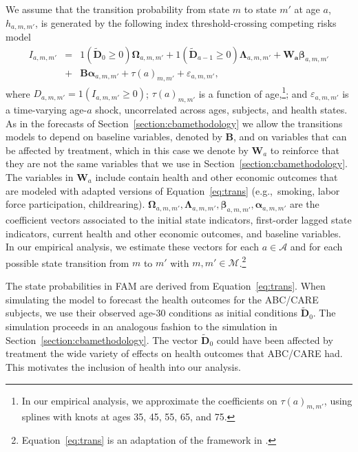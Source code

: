 We assume that the transition probability from state $m$ to state $m'$ at age $a$, $h_{a,m,m'}$, is generated by the following index threshold-crossing competing risks model
\begin{eqnarray}
I_{a,m,m'} &=& \bm{\mathit{1}} \left( \tilde{\bm{D}}_{0} \geq 0 \right) \bm{\Omega}_{a,m,m'} + \bm{\mathit{1}} \left( \tilde{\bm{D}}_{a-1} \geq 0\right) \bm{\Lambda}_{a,m,m'}  + \bm{W_a} \bm{\beta}_{a,m,m'}  \nonumber \\ 
&+&  \bm{B} \bm{\alpha}_{a,m,m'} + \tau \left( a \right)_{m,m'} + \varepsilon_{a,m,m'}, \label{eq:trans}
\end{eqnarray}
where $D_{a,m,m'} = \bm{\mathit{1}}  \left( I_{a,m,m'} \geq 0 \right)$; $\tau \left( a \right)_{m,m'}$ is a function of age,\footnote{In our empirical analysis, we approximate the coefficients on $\tau \left( a \right)_{m,m'}$, using splines with knots at ages 35, 45, 55, 65, and 75.}; and $\varepsilon_{a,m,m'}$ is a time-varying age-$a$ shock, uncorrelated across ages, subjects, and health states. As in the forecasts of Section~\ref{section:cbamethodology} we allow the transitions models to depend on baseline variables, denoted by $\bm{B}$, and on variables that can be affected by treatment, which in this case we denote by $\bm{W}_a$ to reinforce that they are not the same variables that we use in Section~\ref{section:cbamethodology}. The variables in $\bm{W}_a$ include contain health and other economic outcomes that are modeled with adapted versions of Equation~\eqref{eq:trans} (e.g.,\ smoking, labor force participation, childrearing). $ \bm{\Omega}_{a,m,m'},  \bm{\Lambda}_{a,m,m'}, \bm{\beta}_{a,m,m'},  \bm{\alpha}_{a,m,m'}$ are the coefficient vectors associated to the initial state indicators, first-order lagged state indicators, current health and other economic outcomes, and baseline variables. In our empirical analysis, we estimate these vectors for each $a \in \mathcal{A}$ and for each possible state transition from $m$ to $m'$ with $m,m' \in \mathcal{M}$.\footnote{Equation~\eqref{eq:trans} is an adaptation of the framework in \citet{Heckman_1981_heterogeneity,Heckman_1981_IncidentalParametersProblem}.}

The state probabilities in FAM are derived from Equation~\eqref{eq:trans}. When simulating the model to forecast the health outcomes for the ABC/CARE subjects, we use their observed age-30 conditions as initial conditions  $\tilde{\bm{D}}_0$. The simulation proceeds in an analogous fashion to the simulation in Section~\ref{section:cbamethodology}. The vector $\tilde{\bm{D}}_0$ could have been affected by treatment \citet{Campbell_Conti_etal_2014_EarlyChildhoodInvestments} the wide variety of effects on health outcomes that ABC/CARE had. This motivates the inclusion of health into our analysis.

